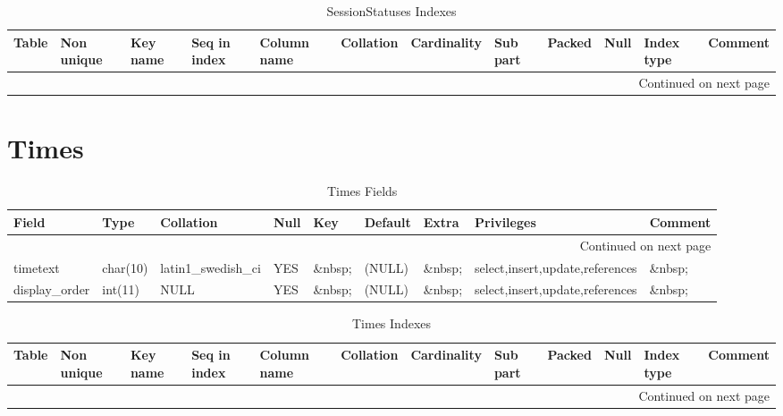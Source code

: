 \documentclass[tablesignature,landscape]{scrartcl}
\begin{document}
\begin{longtable}{|l|l|l|l|l|l|l|l|l|l|l|l|}
\caption{SessionStatuses Indexes} \label{tbl:sessionstatusesindexes}\\
\hline
 Table            &  Non unique  &  Key name  &  Seq in index  &  Column name  &  Collation  &  Cardinality  &  Sub part  &  Packed  &  Null     &  Index type  &  Comment \\
\hline
\endhead
\hline\multicolumn{12}{r}{Continued on next page}\
\endfoot
\endlastfoot
\hline
 SessionStatuses  &           0  &  PRIMARY   &             1  &  statusid     &  A          &            7  &  (NULL)    &  (NULL)  &  \&nbsp;  &  BTREE       &  \&nbsp;  \\
\hline
\end{longtable}
\section{Times}
\label{sec-31}


\begin{longtable}{|l|l|l|l|l|l|l|l|l|}
\caption{Times Fields} \label{tbl:timessfields}\\
\hline
 Field             &  Type      &  Collation                &  Null     &  Key      &  Default  &  Extra    &  Privileges                       &  Comment \\
\hline
\endhead
\hline\multicolumn{9}{r}{Continued on next page}\
\endfoot
\endlastfoot
\hline
 timeindex         &  int(11)   &  NULL                     &  \&nbsp;  &  PRI      &  0        &  \&nbsp;  &  select,insert,update,references  &  \&nbsp;  \\
 timetext          &  char(10)  &  latin1\_{}swedish\_{}ci  &  YES      &  \&nbsp;  &  (NULL)   &  \&nbsp;  &  select,insert,update,references  &  \&nbsp;  \\
 display\_{}order  &  int(11)   &  NULL                     &  YES      &  \&nbsp;  &  (NULL)   &  \&nbsp;  &  select,insert,update,references  &  \&nbsp;  \\
\hline
\end{longtable}


\begin{longtable}{|l|l|l|l|l|l|l|l|l|l|l|l|}
\caption{Times Indexes} \label{tbl:timesindexes}\\
\hline
 Table  &  Non unique  &  Key name  &  Seq in index  &  Column name  &  Collation  &  Cardinality  &  Sub part  &  Packed  &  Null     &  Index type  &  Comment \\
\hline
\endhead
\hline\multicolumn{12}{r}{Continued on next page}\
\endfoot
\endlastfoot
\hline
 Times  &           0  &  PRIMARY   &             1  &  timeindex    &  A          &           24  &  (NULL)    &  (NULL)  &  \&nbsp;  &  BTREE       &  \&nbsp;  \\
\hline
\end{longtable}
\end{document}
